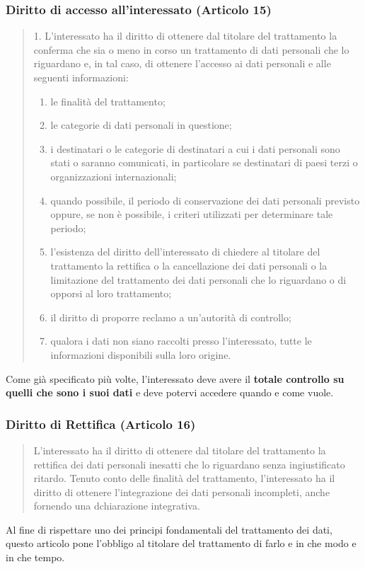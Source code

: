 \subsubsection*{Diritto di accesso all'interessato (Articolo 15)}
\begin{quote}
    1. L'interessato ha il diritto di ottenere dal titolare del trattamento la conferma che sia o meno in corso un trattamento di dati personali che lo riguardano e, in tal caso, di ottenere l'accesso ai dati personali e alle seguenti informazioni:
    \begin{enumerate}[label=\alph*)]
        \item le finalità del trattamento;
        \item le categorie di dati personali in questione;
        \item i destinatari o le categorie di destinatari a cui i dati personali sono stati o saranno comunicati, in particolare se destinatari di paesi terzi o organizzazioni internazionali;
        \item quando possibile, il periodo di conservazione dei dati personali previsto oppure, se non è possibile, i criteri utilizzati per determinare tale periodo;
        \item l'esistenza del diritto dell'interessato di chiedere al titolare del trattamento la rettifica o la cancellazione dei dati personali o la limitazione del trattamento dei dati personali che lo riguardano o di opporsi al loro trattamento;
        \item il diritto di proporre reclamo a un'autorità di controllo;
        \item qualora i dati non siano raccolti presso l'interessato, tutte le informazioni disponibili sulla loro origine.
    \end{enumerate}
\end{quote}
Come già specificato più volte, l'interessato deve avere il \textbf{totale controllo su quelli che sono i suoi dati} e deve potervi accedere quando e come vuole.
\subsubsection*{Diritto di Rettifica (Articolo 16)}
\begin{quote}
    L'interessato ha il diritto di ottenere dal titolare del trattamento la rettifica dei dati personali inesatti che lo riguardano senza ingiustificato ritardo. Tenuto conto delle finalità del trattamento, l'interessato ha il diritto di ottenere l'integrazione dei dati personali incompleti, anche fornendo una dchiarazione integrativa.
\end{quote}
Al fine di rispettare uno dei principi fondamentali del trattamento dei dati, questo articolo pone l'obbligo al titolare del trattamento di farlo e in che modo e in che tempo.
